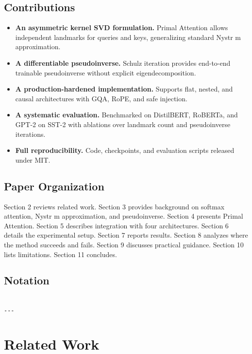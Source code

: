 \subsection{Contributions}

\begin{itemize}
\item \textbf{An asymmetric kernel SVD formulation.} Primal Attention allows independent
  landmarks for queries and keys, generalizing standard Nystr m approximation.
\item \textbf{A differentiable pseudoinverse.} Schulz iteration provides end-to-end
  trainable pseudoinverse without explicit eigendecomposition.
\item \textbf{A production-hardened implementation.} Supports flat, nested, and causal
  architectures with GQA, RoPE, and safe injection.
\item \textbf{A systematic evaluation.} Benchmarked on DistilBERT, RoBERTa, and GPT-2
  on SST-2 with ablations over landmark count and pseudoinverse iterations.
\item \textbf{Full reproducibility.} Code, checkpoints, and evaluation scripts released
  under MIT.

\end{itemize}
\subsection{Paper Organization}

Section 2 reviews related work. Section 3 provides background on softmax 
attention, Nystr m approximation, and pseudoinverse. Section 4 presents 
Primal Attention. Section 5 describes integration with four architectures. 
Section 6 details the experimental setup. Section 7 reports results. Section 
8 analyzes where the method succeeds and fails. Section 9 discusses practical 
guidance. Section 10 lists limitations. Section 11 concludes.



\subsection{Notation}

\begin{lstlisting}

---
\end{lstlisting}


\section{Related Work}

